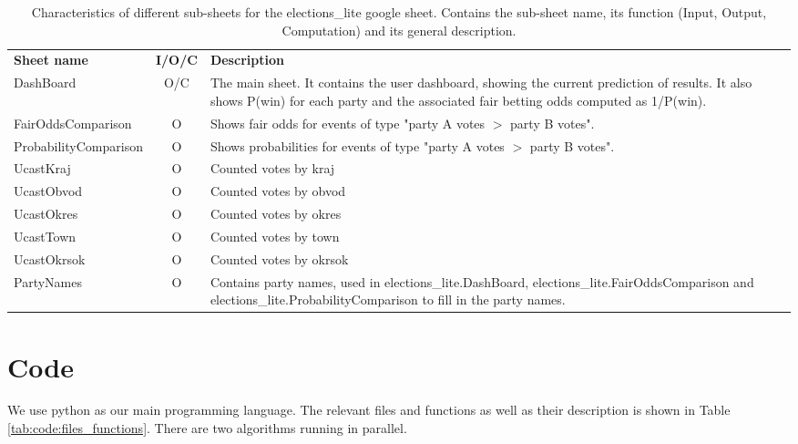 \documentclass[12pt]{article}
\begin{document}
\begin{table}[h]
	\centering
	\begin{tabularx}{\linewidth}{lcX}
		\toprule
		\textbf{Sheet name} & \textbf{I/O/C} & \textbf{Description}\\
		DashBoard & O/C & The main sheet. It contains the user dashboard, showing the current prediction of results. It also shows P(win) for each party and the associated fair betting odds computed as 1/P(win). \\
		FairOddsComparison & O & Shows fair odds for events of type "party A votes $>$ party B votes". \\
		ProbabilityComparison & O & Shows probabilities for events of type "party A votes $>$ party B votes". \\
		UcastKraj & O & Counted votes by kraj\\
		UcastObvod & O & Counted votes by obvod\\
		UcastOkres & O & Counted votes by okres\\					
		UcastTown & O & Counted votes by town\\			
		UcastOkrsok & O & Counted votes by okrsok\\
		PartyNames & O & Contains party names, used in elections\_lite.DashBoard, elections\_lite.FairOddsComparison and elections\_lite.ProbabilityComparison to fill in the party names.\\
		\bottomrule
	\end{tabularx}
	\caption{Characteristics of different sub-sheets for the elections\_lite google sheet. Contains the sub-sheet name, its function (Input, Output, Computation) and its general description.}
	\label{tab:google_sheets_structure:elections_lite}
\end{table}


\section{Code}
We use python as our main programming language. The relevant files and functions as well as  their description is shown in Table \ref{tab:code:files_functions}. There are two algorithms running in parallel.
\end{document}
